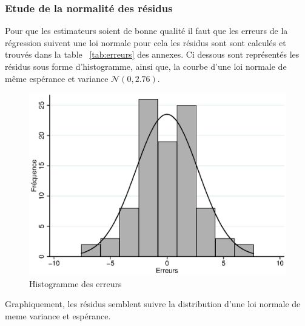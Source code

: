 \documentclass{article}
\begin{document}
\subsubsection{Etude de la normalité des résidus}
Pour que les estimateurs soient de bonne qualité il faut que les erreurs de la régression suivent une loi normale pour cela les résidus sont sont calculés 
et trouvés dans la table ~\ref{tab:erreurs} des annexes. Ci dessous sont représentés les résidus sous forme d'histogramme, ainsi que, la courbe d'une 
loi normale de même espérance et variance $\mathcal{N}(0,2.76)$.
\begin{figure}[H]
	\centering
	\includegraphics[scale=.6]{Graph.eps}
    \caption{Histogramme des erreurs}
	\label{fig:histogrammeErreur}
\end{figure}
Graphiquement, les résidus semblent suivre la distribution d'une loi normale de meme variance et espérance.
\end{document}
